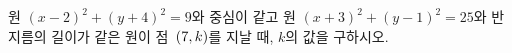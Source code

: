 원 $(x-2)^2+(y+4)^2=9$와 중심이 같고 원 $(x+3)^2+(y-1)^2=25$와 반지름의 길이가 같은 원이 점~$(7{,}\mkern3mu\mathopen{}k)$를 지날 때, $k$의 값을 구하시오.
